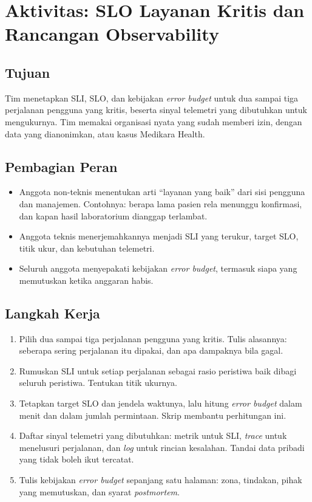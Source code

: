 \section{Aktivitas: SLO Layanan Kritis dan Rancangan Observability}
\label{sec:ch11-aktivitas}

\subsection*{Tujuan}

Tim menetapkan SLI, SLO, dan kebijakan \textit{error budget} untuk dua sampai tiga perjalanan
pengguna yang kritis, beserta sinyal telemetri yang dibutuhkan untuk mengukurnya. Tim memakai
organisasi nyata yang sudah memberi izin, dengan data yang dianonimkan, atau kasus Medikara Health.

\subsection*{Pembagian Peran}

\begin{itemize}
  \item Anggota non-teknis menentukan arti ``layanan yang baik'' dari sisi pengguna dan
        manajemen. Contohnya: berapa lama pasien rela menunggu konfirmasi, dan kapan hasil
        laboratorium dianggap terlambat.
  \item Anggota teknis menerjemahkannya menjadi SLI yang terukur, target SLO, titik ukur, dan
        kebutuhan telemetri.
  \item Seluruh anggota menyepakati kebijakan \textit{error budget}, termasuk siapa yang memutuskan
        ketika anggaran habis.
\end{itemize}

\subsection*{Langkah Kerja}

\begin{enumerate}
  \item Pilih dua sampai tiga perjalanan pengguna yang kritis. Tulis alasannya: seberapa sering
        perjalanan itu dipakai, dan apa dampaknya bila gagal.
  \item Rumuskan SLI untuk setiap perjalanan sebagai rasio peristiwa baik dibagi seluruh
        peristiwa. Tentukan titik ukurnya.
  \item Tetapkan target SLO dan jendela waktunya, lalu hitung \textit{error budget} dalam menit dan
        dalam jumlah permintaan. Skrip 
        membantu perhitungan ini.
  \item Daftar sinyal telemetri yang dibutuhkan: metrik untuk SLI, \textit{trace} untuk menelusuri
        perjalanan, dan \textit{log} untuk rincian kesalahan. Tandai data pribadi yang tidak boleh
        ikut tercatat.
  \item Tulis kebijakan \textit{error budget} sepanjang satu halaman: zona, tindakan, pihak yang
        memutuskan, dan syarat \textit{postmortem}.
\end{enumerate}

